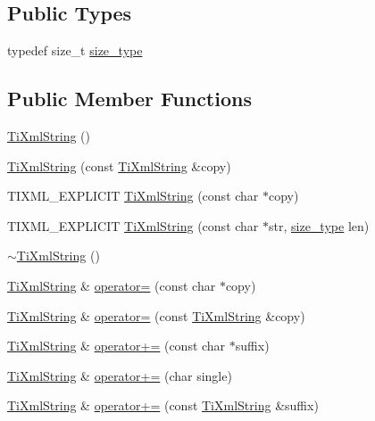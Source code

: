\subsection*{Public Types}
\begin{DoxyCompactItemize}
\item 
typedef size\_\-t \hyperlink{classTiXmlString_abeb2c1893a04c17904f7c06546d0b971}{size\_\-type}
\end{DoxyCompactItemize}
\subsection*{Public Member Functions}
\begin{DoxyCompactItemize}
\item 
\hyperlink{classTiXmlString_a342f61e0fc2244df300b73aedf6d3fef}{TiXmlString} ()
\item 
\hyperlink{classTiXmlString_ac80fe17693a438c9ab2591664743fcb6}{TiXmlString} (const \hyperlink{classTiXmlString}{TiXmlString} \&copy)
\item 
TIXML\_\-EXPLICIT \hyperlink{classTiXmlString_aa3b32bd2891a757c9f36c21db44c81d2}{TiXmlString} (const char $\ast$copy)
\item 
TIXML\_\-EXPLICIT \hyperlink{classTiXmlString_a4b17ea5c5db986f14827223dfa8f1547}{TiXmlString} (const char $\ast$str, \hyperlink{classTiXmlString_abeb2c1893a04c17904f7c06546d0b971}{size\_\-type} len)
\item 
\hyperlink{classTiXmlString_a7ac03f581ca3422c4808162ab14f3450}{$\sim$TiXmlString} ()
\item 
\hyperlink{classTiXmlString}{TiXmlString} \& \hyperlink{classTiXmlString_ae0bc6147afc0ec2aa0da3a3c0a8fcfb0}{operator=} (const char $\ast$copy)
\item 
\hyperlink{classTiXmlString}{TiXmlString} \& \hyperlink{classTiXmlString_ab1f1f5d3eceaa0f22d0a7e6055ea81b0}{operator=} (const \hyperlink{classTiXmlString}{TiXmlString} \&copy)
\item 
\hyperlink{classTiXmlString}{TiXmlString} \& \hyperlink{classTiXmlString_ab56336ac2aa2a08d24a71eb9a2b502a5}{operator+=} (const char $\ast$suffix)
\item 
\hyperlink{classTiXmlString}{TiXmlString} \& \hyperlink{classTiXmlString_a6aa09d5240470b76d54ec709e04f8c13}{operator+=} (char single)
\item 
\hyperlink{classTiXmlString}{TiXmlString} \& \hyperlink{classTiXmlString_afdcae5ea2b4d9e194dc21226b817f417}{operator+=} (const \hyperlink{classTiXmlString}{TiXmlString} \&suffix)
\item 

\end{DoxyCompactItemize}
